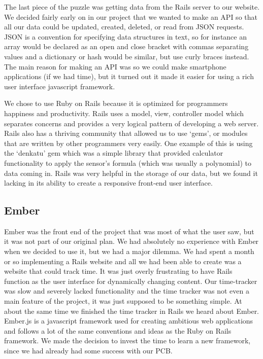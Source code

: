\documentclass[letterpaper, 12 pt]{article}
\begin{document}
  The last piece of the puzzle was getting data from the Rails server to our website. We decided fairly early on in our project that we wanted to make an API so that all our data could be updated, created, deleted, or read from JSON requests. JSON is a convention for specifying data structures in text, so for instance an array would be declared as an open and close bracket with commas separating values and a dictionary or hash would be similar, but use curly braces instead. The main reason for making an API was so we could make smartphone applications (if we had time), but it turned out it made it easier for using a rich user interface javascript framework.  

  We chose to use Ruby on Rails because it is optimized for programmers happiness and productivity. Rails uses a model, view, controller model which separates concerns and provides a very logical pattern of developing a web server. Rails also has a thriving community that allowed us to use ‘gems’, or modules that are written by other programmers very easily. One example of this is using the ‘denkatu’ gem which was a simple library that provided calculator functionality to apply the sensor’s formula (which was usually a polynomial) to data coming in. Rails was very helpful in the storage of our data, but we found it lacking in its ability to create a responsive front-end user interface. 

\subsection{Ember}
Ember was the front end of the project that was most of what the user saw, but it was not part of our original plan. We had absolutely no experience with Ember when we decided to use it, but we had a major dilemma. We had spent a month or so implementing a Rails website and all we had been able to create was a website that could track time. It was just overly frustrating to have Rails function as the user interface for dynamically changing content. Our time-tracker was slow and severely lacked functionality and the time tracker was not even a main feature of the project, it was just supposed to be something simple. At about the same time we finished the time tracker in Rails we heard about Ember. Ember.js is a javascript framework used for creating ambitious web applications and follows a lot of the same conventions and ideas as the Ruby on Rails framework. We made the decision to invest the time to learn a new framework, since we had already had some success with our PCB.
\end{document}
